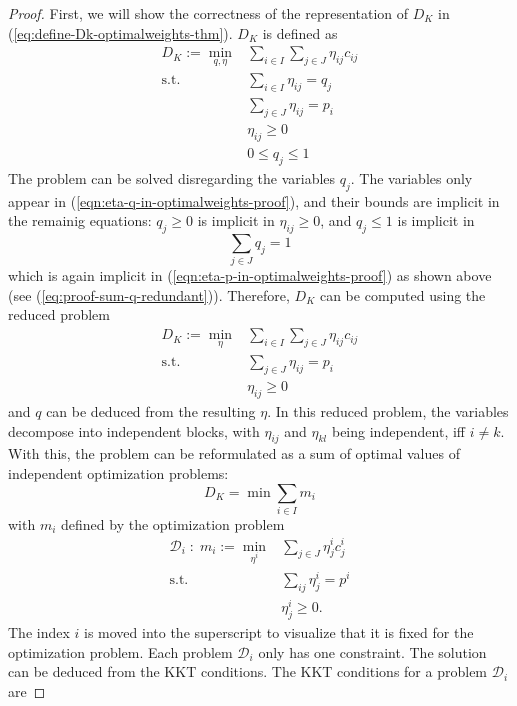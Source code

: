 \begin{proof}
First, we will show the correctness of the representation of $D_K$ in (\ref{eq:define-Dk-optimalweights-thm}).
$D_K$ is defined as
\begin{align}
  D_K := \min\limits_{q, \eta}& \sum_{i\in I}\sum_{j\in J}\eta_{ij}c_{ij}\\
  \text{s.t.}&\sum_{i\in I}\eta_{ij} = q_j\label{eqn:eta-q-in-optimalweights-proof}\\
  &\sum_{j\in J}\eta_{ij} = p_i\label{eqn:eta-p-in-optimalweights-proof}\\
  &\eta_{ij} \geq 0\\
  &0 \leq q_j \leq 1
\end{align}
The problem can be solved disregarding the variables $q_j$.
The variables only appear in (\ref{eqn:eta-q-in-optimalweights-proof}), and their bounds are implicit in the remainig equations: $q_j\geq 0$ is implicit in $\eta_{ij}\geq 0$, and $q_j\leq 1$ is implicit in
\[\sum_{j\in J}q_j=1\]
which is again implicit in (\ref{eqn:eta-p-in-optimalweights-proof}) as shown above (see (\ref{eq:proof-sum-q-redundant})).
Therefore, $D_K$ can be computed using the reduced problem
\begin{align}
  D_K := \min\limits_{\eta}& \sum_{i\in I}\sum_{j\in J}\eta_{ij}c_{ij}\\
  \text{s.t.}&\sum_{j\in J}\eta_{ij} = p_i\\
  &\eta_{ij} \geq 0
\end{align}
and $q$ can be deduced from the resulting $\eta$.
In this reduced problem, the variables decompose into independent blocks, with $\eta_{ij}$ and $\eta_{kl}$ being independent, iff $i\neq k$.
With this, the problem can be reformulated as a sum of optimal values of independent optimization problems:
\begin{equation}
  \label{eqn:Dk-decomposition-in-mi}
  D_K = \min \sum_{i\in I} m_i
\end{equation}
with $m_i$ defined by the optimization problem
\begin{align}
  \mathcal{D}_i\; :\; m_i :=\min\limits_{\eta^i}&\sum_{j\in J}\eta_{j}^ic_{j}^i\\
  \text{s.t.}&\sum_{ij}\eta_j^i = p^i\\
  &\eta_j^i\geq 0.
\end{align}
The index $i$ is moved into the superscript to visualize that it is fixed for the optimization problem.
Each problem $\mathcal{D}_i$ only has one constraint.
The solution can be deduced from the KKT conditions.
The KKT conditions for a problem $\mathcal{D}_i$ are

\end{proof}

